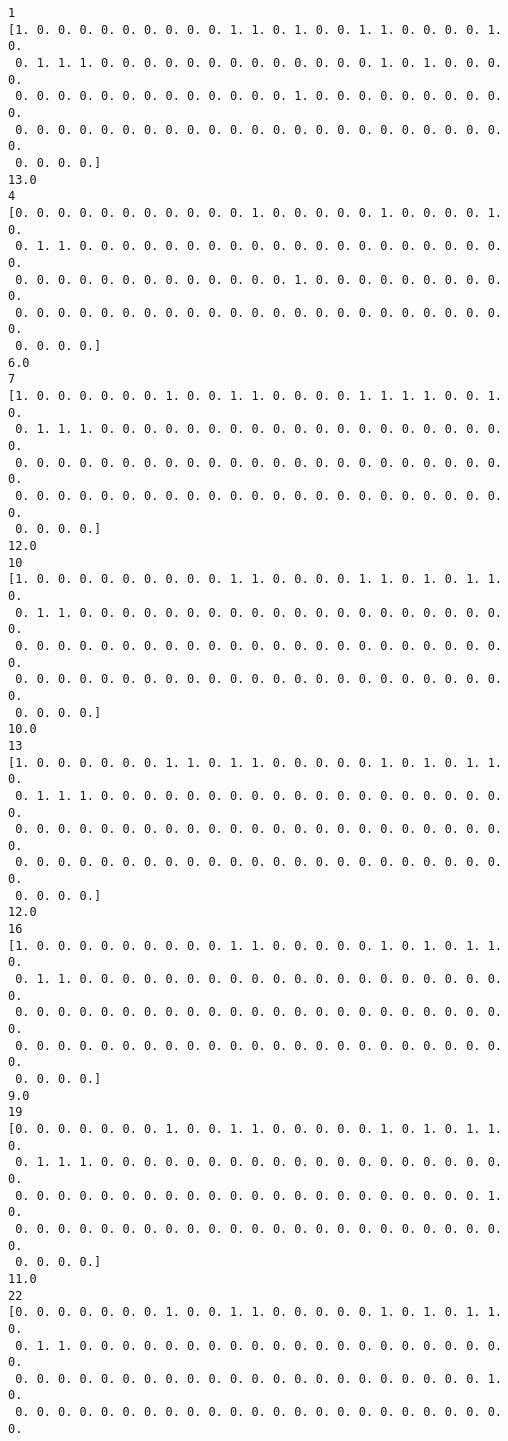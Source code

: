 \documentclass[11pt]{article}
\begin{document}
    \begin{Verbatim}[commandchars=\\\{\}]
1
[1. 0. 0. 0. 0. 0. 0. 0. 0. 0. 1. 1. 0. 1. 0. 0. 1. 1. 0. 0. 0. 0. 1. 0.
 0. 1. 1. 1. 0. 0. 0. 0. 0. 0. 0. 0. 0. 0. 0. 0. 0. 1. 0. 1. 0. 0. 0. 0.
 0. 0. 0. 0. 0. 0. 0. 0. 0. 0. 0. 0. 0. 1. 0. 0. 0. 0. 0. 0. 0. 0. 0. 0.
 0. 0. 0. 0. 0. 0. 0. 0. 0. 0. 0. 0. 0. 0. 0. 0. 0. 0. 0. 0. 0. 0. 0. 0.
 0. 0. 0. 0.]
13.0
4
[0. 0. 0. 0. 0. 0. 0. 0. 0. 0. 0. 1. 0. 0. 0. 0. 0. 1. 0. 0. 0. 0. 1. 0.
 0. 1. 1. 0. 0. 0. 0. 0. 0. 0. 0. 0. 0. 0. 0. 0. 0. 0. 0. 0. 0. 0. 0. 0.
 0. 0. 0. 0. 0. 0. 0. 0. 0. 0. 0. 0. 0. 1. 0. 0. 0. 0. 0. 0. 0. 0. 0. 0.
 0. 0. 0. 0. 0. 0. 0. 0. 0. 0. 0. 0. 0. 0. 0. 0. 0. 0. 0. 0. 0. 0. 0. 0.
 0. 0. 0. 0.]
6.0
7
[1. 0. 0. 0. 0. 0. 0. 1. 0. 0. 1. 1. 0. 0. 0. 0. 1. 1. 1. 1. 0. 0. 1. 0.
 0. 1. 1. 1. 0. 0. 0. 0. 0. 0. 0. 0. 0. 0. 0. 0. 0. 0. 0. 0. 0. 0. 0. 0.
 0. 0. 0. 0. 0. 0. 0. 0. 0. 0. 0. 0. 0. 0. 0. 0. 0. 0. 0. 0. 0. 0. 0. 0.
 0. 0. 0. 0. 0. 0. 0. 0. 0. 0. 0. 0. 0. 0. 0. 0. 0. 0. 0. 0. 0. 0. 0. 0.
 0. 0. 0. 0.]
12.0
10
[1. 0. 0. 0. 0. 0. 0. 0. 0. 0. 1. 1. 0. 0. 0. 0. 1. 1. 0. 1. 0. 1. 1. 0.
 0. 1. 1. 0. 0. 0. 0. 0. 0. 0. 0. 0. 0. 0. 0. 0. 0. 0. 0. 0. 0. 0. 0. 0.
 0. 0. 0. 0. 0. 0. 0. 0. 0. 0. 0. 0. 0. 0. 0. 0. 0. 0. 0. 0. 0. 0. 0. 0.
 0. 0. 0. 0. 0. 0. 0. 0. 0. 0. 0. 0. 0. 0. 0. 0. 0. 0. 0. 0. 0. 0. 0. 0.
 0. 0. 0. 0.]
10.0
13
[1. 0. 0. 0. 0. 0. 0. 1. 1. 0. 1. 1. 0. 0. 0. 0. 0. 1. 0. 1. 0. 1. 1. 0.
 0. 1. 1. 1. 0. 0. 0. 0. 0. 0. 0. 0. 0. 0. 0. 0. 0. 0. 0. 0. 0. 0. 0. 0.
 0. 0. 0. 0. 0. 0. 0. 0. 0. 0. 0. 0. 0. 0. 0. 0. 0. 0. 0. 0. 0. 0. 0. 0.
 0. 0. 0. 0. 0. 0. 0. 0. 0. 0. 0. 0. 0. 0. 0. 0. 0. 0. 0. 0. 0. 0. 0. 0.
 0. 0. 0. 0.]
12.0
16
[1. 0. 0. 0. 0. 0. 0. 0. 0. 0. 1. 1. 0. 0. 0. 0. 0. 1. 0. 1. 0. 1. 1. 0.
 0. 1. 1. 0. 0. 0. 0. 0. 0. 0. 0. 0. 0. 0. 0. 0. 0. 0. 0. 0. 0. 0. 0. 0.
 0. 0. 0. 0. 0. 0. 0. 0. 0. 0. 0. 0. 0. 0. 0. 0. 0. 0. 0. 0. 0. 0. 0. 0.
 0. 0. 0. 0. 0. 0. 0. 0. 0. 0. 0. 0. 0. 0. 0. 0. 0. 0. 0. 0. 0. 0. 0. 0.
 0. 0. 0. 0.]
9.0
19
[0. 0. 0. 0. 0. 0. 0. 1. 0. 0. 1. 1. 0. 0. 0. 0. 0. 1. 0. 1. 0. 1. 1. 0.
 0. 1. 1. 1. 0. 0. 0. 0. 0. 0. 0. 0. 0. 0. 0. 0. 0. 0. 0. 0. 0. 0. 0. 0.
 0. 0. 0. 0. 0. 0. 0. 0. 0. 0. 0. 0. 0. 0. 0. 0. 0. 0. 0. 0. 0. 0. 1. 0.
 0. 0. 0. 0. 0. 0. 0. 0. 0. 0. 0. 0. 0. 0. 0. 0. 0. 0. 0. 0. 0. 0. 0. 0.
 0. 0. 0. 0.]
11.0
22
[0. 0. 0. 0. 0. 0. 0. 1. 0. 0. 1. 1. 0. 0. 0. 0. 0. 1. 0. 1. 0. 1. 1. 0.
 0. 1. 1. 0. 0. 0. 0. 0. 0. 0. 0. 0. 0. 0. 0. 0. 0. 0. 0. 0. 0. 0. 0. 0.
 0. 0. 0. 0. 0. 0. 0. 0. 0. 0. 0. 0. 0. 0. 0. 0. 0. 0. 0. 0. 0. 0. 1. 0.
 0. 0. 0. 0. 0. 0. 0. 0. 0. 0. 0. 0. 0. 0. 0. 0. 0. 0. 0. 0. 0. 0. 0. 0.

\end{Verbatim}
\end{document}
